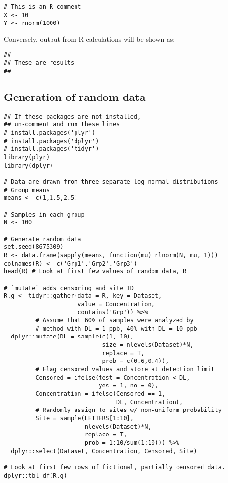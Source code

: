 \begin{snugshade}
\begin{verbatim}
# This is an R comment
X <- 10
Y <- rnorm(1000)
\end{verbatim}
\end{snugshade}

Conversely, output from R calculations will be shown as:

\begin{verbatim}
##
## These are results
##
\end{verbatim}

\subsection{Generation of random data}
\begin{snugshade}
\begin{verbatim}
## If these packages are not installed,
## un-comment and run these lines
# install.packages('plyr')
# install.packages('dplyr')
# install.packages('tidyr')
library(plyr)
library(dplyr)

# Data are drawn from three separate log-normal distributions
# Group means
means <- c(1,1.5,2.5)

# Samples in each group
N <- 100

# Generate random data
set.seed(8675309)
R <- data.frame(sapply(means, function(mu) rlnorm(N, mu, 1)))
colnames(R) <- c('Grp1','Grp2','Grp3')
head(R) # Look at first few values of random data, R

# `mutate` adds censoring and site ID
R.g <- tidyr::gather(data = R, key = Dataset,
                     value = Concentration,
                     contains('Grp')) %>%
         # Assume that 60% of samples were analyzed by
         # method with DL = 1 ppb, 40% with DL = 10 ppb
  dplyr::mutate(DL = sample(c(1, 10),
                            size = nlevels(Dataset)*N,
                            replace = T,
                            prob = c(0.6,0.4)),
         # Flag censored values and store at detection limit
         Censored = ifelse(test = Concentration < DL,
                           yes = 1, no = 0),
         Concentration = ifelse(Censored == 1,
                                DL, Concentration),
         # Randomly assign to sites w/ non-uniform probability
         Site = sample(LETTERS[1:10],
                       nlevels(Dataset)*N,
                       replace = T,
                       prob = 1:10/sum(1:10))) %>%
  dplyr::select(Dataset, Concentration, Censored, Site)

# Look at first few rows of fictional, partially censored data.
dplyr::tbl_df(R.g)
\end{verbatim}
\end{snugshade}

